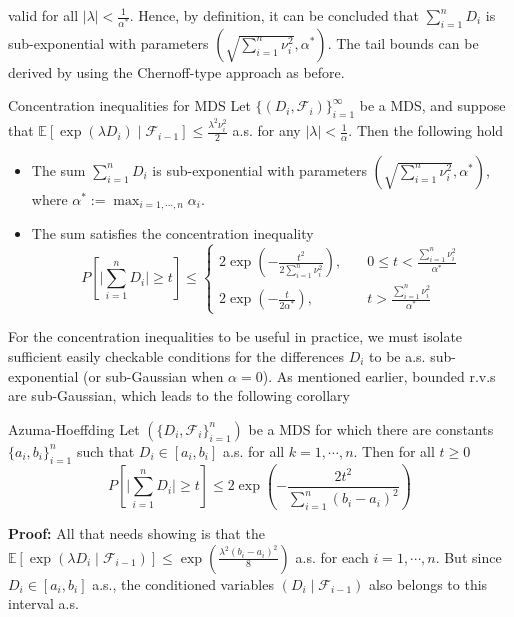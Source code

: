 \documentclass[10pt,handout,english]{beamer}
\newcommand{\E}{\mathbb{E}}
\newcommand{\F}{\mathcal{F}}
\begin{document}
\begin{frame}[allowframebreaks]
\[\]
valid for all $\lvert\lambda\rvert< \frac{1}{\alpha^*}$. Hence, by definition, it can be concluded that $\sum_{i=1}^nD_i$ is sub-exponential with parameters $(\sqrt{\sum_{i=1}^n\nu_i^2},\alpha^*)$.  The tail bounds can be derived by using the Chernoff-type approach as before.
\begin{block}{Concentration inequalities for MDS}
Let $\{(D_i,\F_i)\}_{i=1}^{\infty}$ be a MDS, and suppose that $\E[\exp(\lambda D_i)\mid\F_{i-1}]\leq\frac{\lambda^2\nu_i^2}{2}$ a.s. for any $\lvert\lambda\rvert<\frac{1}{\alpha}$. Then the following hold
\begin{itemize}
\item The sum $\sum_{i=1}^{n}D_i$ is sub-exponential with parameters $\left(\sqrt{\sum_{i=1}^{n}\nu_i^2},\alpha^*\right)$, where $\alpha^*:=\max_{i=1,\cdots,n}\alpha_i$.
\item The sum satisfies the concentration inequality
\[
P\left[\lvert \sum\limits_{i=1}^nD_i\rvert\geq t\right]\leq
\begin{cases}
2\exp\left(-\frac{t^2}{2\sum_{i=1}^{n}\nu_i^2}\right),\quad &0\leq t<\frac{\sum_{i=1}^{n}\nu_i^2}{\alpha^*}\\
2\exp\left(-\frac{t}{2\alpha^*}\right),\quad &t>\frac{\sum_{i=1}^{n}\nu_i^2}{\alpha^*}
\end{cases}
\]
\end{itemize}
\end{block}
For the concentration inequalities to be useful in practice, we must isolate sufficient easily checkable conditions for the differences $D_i$ to be a.s. sub-exponential (or sub-Gaussian when $\alpha=0$). As mentioned earlier, bounded r.v.s are sub-Gaussian, which leads to the following corollary
\begin{block}{Azuma-Hoeffding}
Let $(\{D_i,\F_i\}_{i=1}^{n})$ be a MDS for which there are constants $\{a_i,b_i\}_{i=1}^n$ such that $D_i\in[a_i,b_i]$ a.s. for all $k=1,\cdots,n$. Then for all $t\geq0$
\[
P\left[\lvert\sum\limits_{i=1}^{n}D_i\rvert\geq t\right]\leq2\exp\left(-\frac{2t^2}{\sum_{i=1}^{n}(b_i-a_i)^2}\right)
\]
\end{block}

\textbf{Proof:}
All that needs showing is that the $\E[\exp(\lambda D_i\mid\F_{i-1})]\leq\exp\left(\frac{\lambda^2(b_i-a_i)^2}{8}\right)$ a.s. for each $i=1,\cdots,n$. But since $D_i\in[a_i,b_i]$ a.s., the conditioned variables $(D_i\mid\F_{i-1})$ also belongs to this interval a.s.
\end{frame}
\end{document}
